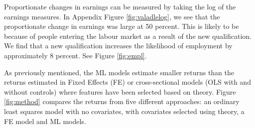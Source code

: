 \documentclass[12pt, a4paper]{article}
\begin{document}
%
%

Proportionate changes in earnings can be measured by taking the log of the earnings measures. In Appendix Figure \ref{fig:valadlelog}, we see that the proportionate change in earnings was large at 50 percent. This is likely to be because of people entering the labour market as a result of the new qualification. We find that a new qualification increases the likelihood of employment by approximately 8 percent. See Figure \ref{fig:empl}.

As previously mentioned, the ML models estimate smaller returns than the returns estimated in Fixed Effects (FE) or cross-sectional models (OLS with and without controls) where features have been selected based on theory. Figure \ref{fig:method} compares the returns from five different approaches: an ordinary least squares model with no covariates, with covariates selected using theory, a FE model and ML models.

%
\end{document}
